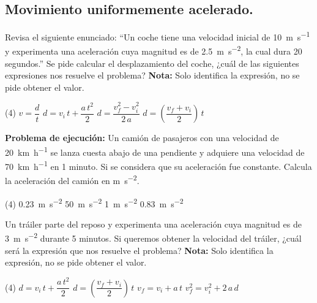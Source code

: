 \documentclass[12pt, letter]{exam}
\begin{document}


\newpage

\begin{questions}
    \section{Movimiento uniformemente acelerado.}

    \question Revisa el siguiente enunciado: \enquote{Un coche tiene una velocidad inicial de \SI{10}{\meter\per\second} y experimenta una aceleración cuya magnitud es de \SI{2.5}{\meter\per\square\second}, la cual dura \num{20} segundos.} Se pide calcular el desplazamiento del coche, ¿cuál de las siguientes expresiones nos resuelve el problema? \textbf{Nota: } Solo identifica la expresión, no se pide obtener el valor.
    \begin{tasks}(4)
        \task $v = \dfrac{d}{t}$
        \task $d = v_{i} \, t + \dfrac{a \, t^{2}}{2}$
        \task $d = \dfrac{v_{f}^{2} - v_{i}^{2}}{2 \, a}$
        \task $d = \left( \dfrac{v_{f} + v_{i}}{2} \right) \, t$
    \end{tasks}
    \question \label{Problema_01} \textbf{Problema de ejecución:} Un camión de pasajeros con una velocidad de \SI{20}{\kilo\meter\per\hour} se lanza cuesta abajo de una pendiente y adquiere una velocidad de \SI{70}{\kilo\meter\per\hour} en \num{1} minuto. Si se considera que su aceleración fue constante. Calcula la aceleración del camión en \unit{\meter\per\square\second}.
    \begin{tasks}(4)
        \task \SI{0.23}{\meter\per\square\second}
        \task \SI{50}{\meter\per\square\second}
        \task \SI{1}{\meter\per\square\second}
        \task \SI{0.83}{\meter\per\square\second}
    \end{tasks}
    \question Un tráiler parte del reposo y experimenta una aceleración cuya magnitud es de \SI{3}{\meter\per\square\second} durante \num{5} minutos. Si queremos obtener la velocidad del tráiler, ¿cuál será la expresión que nos resuelve el problema? \textbf{Nota: } Solo identifica la expresión, no se pide obtener el valor.
    \begin{tasks}(4)
        \task $d = v_{i} \, t + \dfrac{a \, t^{2}}{2}$
        \task $d = \left( \dfrac{v_{f} + v_{i}}{2} \right) \, t$
        \task $v_{f} = v_{i} + a \, t$
        \task $v_{f}^{2} = v_{i}^{2} + 2\, a \, d$
    \end{tasks}
    

\end{questions}
\end{document}
